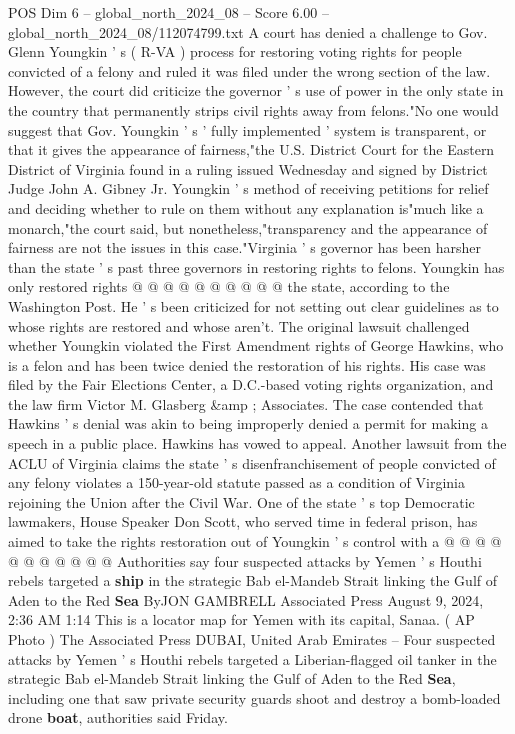\begin{textsample}{POS Dim 6 – global\_north\_2024\_08 – Score 6.00 – global\_north\_2024\_08/112074799.txt}  \label{ex:f6_pos_374}
A court has denied a challenge to Gov.
Glenn Youngkin ' s ( R-VA ) process for restoring voting rights for people convicted of a felony and ruled it was filed under the wrong section of the law.
However, the court did criticize the governor ' s use of power in the only state in the country that permanently strips civil rights away from felons."No one would suggest that Gov.
Youngkin ' s ' fully implemented ' system is transparent, or that it gives the appearance of fairness,"the U.S.
District Court for the Eastern District of Virginia found in a ruling issued Wednesday and signed by District Judge John A.
Gibney Jr.
Youngkin ' s method of receiving petitions for relief and deciding whether to rule on them without any explanation is"much like a monarch,"the court said, but nonetheless,"transparency and the appearance of fairness are not the issues in this case."Virginia ' s governor has been harsher than the state ' s past three governors in restoring rights to felons.
Youngkin has only restored rights @ @ @ @ @ @ @ @ @ @ the state, according to the Washington Post.
He ' s been criticized for not setting out clear guidelines as to whose rights are restored and whose aren't.
The original lawsuit challenged whether Youngkin violated the First Amendment rights of George Hawkins, who is a felon and has been twice denied the restoration of his rights.
His case was filed by the Fair Elections Center, a D.C.-based voting rights organization, and the law firm Victor M.
Glasberg \&amp ; Associates.
The case contended that Hawkins ' s denial was akin to being improperly denied a permit for making a speech in a public place.
Hawkins has vowed to appeal.
Another lawsuit from the ACLU of Virginia claims the state ' s disenfranchisement of people convicted of any felony violates a 150-year-old statute passed as a condition of Virginia rejoining the Union after the Civil War.
One of the state ' s top Democratic lawmakers, House Speaker Don Scott, who served time in federal prison, has aimed to take the rights restoration out of Youngkin ' s control with a @ @ @ @ @ @ @ @ @ @ @ Authorities say four suspected attacks by Yemen ' s Houthi rebels targeted a \textbf{ship} in the strategic Bab el-Mandeb Strait linking the Gulf of Aden to the Red \textbf{Sea} ByJON GAMBRELL Associated Press August 9, 2024, 2:36 AM 1:14 This is a locator map for Yemen with its capital, Sanaa. ( AP Photo ) The Associated Press DUBAI, United Arab Emirates -- Four suspected attacks by Yemen ' s Houthi rebels targeted a Liberian-flagged oil tanker in the strategic Bab el-Mandeb Strait linking the Gulf of Aden to the Red \textbf{Sea}, including one that saw private security guards shoot and destroy a bomb-loaded drone \textbf{boat}, authorities said Friday.

\end{textsample}
